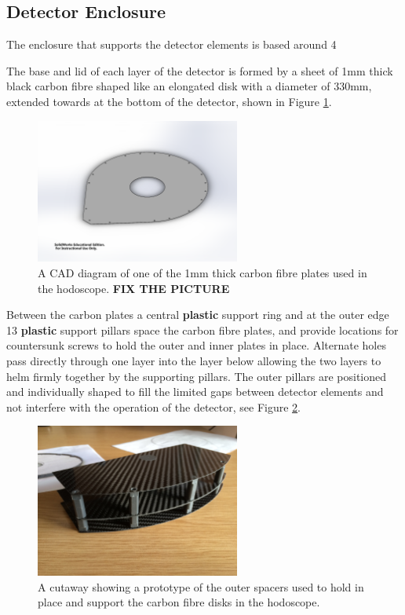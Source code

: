 \subsection{Detector Enclosure}

The enclosure that supports the detector elements is based around 4  

The base and lid of each layer of the detector is formed by a sheet of 1mm thick black carbon fibre shaped like an elongated disk with a diameter of 330mm, extended towards at the bottom of the detector, shown in Figure \ref{CarbonFibrePlate}. 

\begin{figure}
	\centering
	\includegraphics[width=0.6\textwidth]{ImgChap1/CarbonFiberPlateDerek}
	\caption{A CAD diagram of one of the 1mm thick carbon fibre plates used in the hodoscope. \textbf{FIX THE PICTURE}}
	\label{CarbonFibrePlate}
\end{figure}

Between the carbon plates a central \textbf{plastic} support ring and at the outer edge 13 \textbf{plastic} support pillars space the carbon fibre plates, and provide locations for countersunk screws to hold the outer and inner plates in place. Alternate holes pass directly through one layer into the layer below allowing the two layers to helm firmly together by the supporting pillars. The outer pillars are positioned and individually shaped to fill the limited gaps between detector elements and not interfere with the operation of the detector, see Figure \ref{Spacers}.

\begin{figure}
	\centering
	\includegraphics[width=0.6\textwidth]{ImgChap1/enclosure_hodoscope7}
	\caption{A cutaway showing a prototype of the outer spacers used to hold in place and support the carbon fibre disks in the hodoscope.}
	\label{Spacers}
\end{figure}

